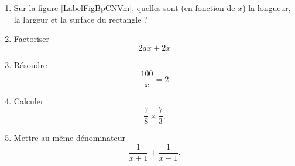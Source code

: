 
\begin{exercice}\label{exoSeconde-0018}

    \begin{multicols}{2}

    \begin{enumerate}
        \item
Sur la figure \ref{LabelFigBpCNVm}, quelles sont (en fonction de \( x\)) la longueur, la largeur et la surface du rectangle ?
\newcommand{\CaptionFigBpCNVm}{figure de l'exercice \ref{exoSeconde-0018}} 

        \item
            Factoriser
            \begin{equation}
                2ax+2x   
            \end{equation}
        \item
            Résoudre
            \begin{equation}
                \frac{ 100 }{ x }=2
            \end{equation}
        \item
            Calculer
            \begin{equation}
                \frac{ 7 }{ 8 }\times\frac{ 7 }{ 3 }.
            \end{equation}
        \item
            Mettre au même dénominateur
            \begin{equation}
                \frac{1}{ x+1 }+\frac{1}{ x-1 }.
            \end{equation}
    \end{enumerate}
    \end{multicols}

\end{exercice}
